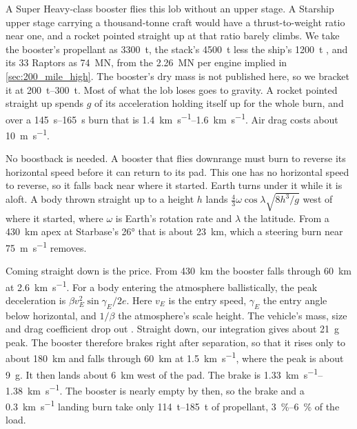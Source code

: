 \documentclass{article}
\begin{document}
A Super Heavy-class booster flies this lob without an upper stage. A Starship upper stage carrying a thousand-tonne craft would have a thrust-to-weight ratio near one, and a rocket pointed straight up at that ratio barely climbs. We take the booster's propellant as \SI{3300}{\tonne}, the stack's \SI{4500}{\tonne} less the ship's \SI{1200}{\tonne} \cite{gunter_starship}, and its 33 Raptors as \SI{74}{\mega\newton}, from the \SI{2.26}{\mega\newton} per engine implied in \autoref{sec:200_mile_high}. The booster's dry mass is not published here, so we bracket it at \SIrange{200}{300}{\tonne}. Most of what the lob loses goes to gravity. A rocket pointed straight up spends $g$ of its acceleration holding itself up for the whole burn, and over a \SIrange{145}{165}{\second} burn that is \SIrange{1.4}{1.6}{\kilo\meter\per\second}. Air drag costs about \SI{10}{\meter\per\second}.

No boostback is needed. A booster that flies downrange must burn to reverse its horizontal speed before it can return to its pad. This one has no horizontal speed to reverse, so it falls back near where it started. Earth turns under it while it is aloft. A body thrown straight up to a height $h$ lands $\tfrac{4}{3}\omega\cos\lambda\sqrt{8h^3/g}$ west of where it started, where $\omega$ is Earth's rotation rate and $\lambda$ the latitude. From a \SI{430}{\kilo\meter} apex at Starbase's \ang{26} that is about \SI{23}{\kilo\meter}, which a steering burn near \SI{75}{\meter\per\second} removes.

Coming straight down is the price. From \SI{430}{\kilo\meter} the booster falls through \SI{60}{\kilo\meter} at \SI{2.6}{\kilo\meter\per\second}. For a body entering the atmosphere ballistically, the peak deceleration is $\beta v_E^2\sin\gamma_E/2e$. Here $v_E$ is the entry speed, $\gamma_E$ the entry angle below horizontal, and $1/\beta$ the atmosphere's scale height. The vehicle's mass, size and drag coefficient drop out \cite{allen_eggers1958_naca1381}. Straight down, our integration gives about \SI{21}{g} peak. The booster therefore brakes right after separation, so that it rises only to about \SI{180}{\kilo\meter} and falls through \SI{60}{\kilo\meter} at \SI{1.5}{\kilo\meter\per\second}, where the peak is about \SI{9}{g}. It then lands about \SI{6}{\kilo\meter} west of the pad. The brake is \SIrange{1.33}{1.38}{\kilo\meter\per\second}. The booster is nearly empty by then, so the brake and a \SI{0.3}{\kilo\meter\per\second} landing burn take only \SIrange{114}{185}{\tonne} of propellant, \SIrange{3}{6}{\percent} of the load.
\end{document}
